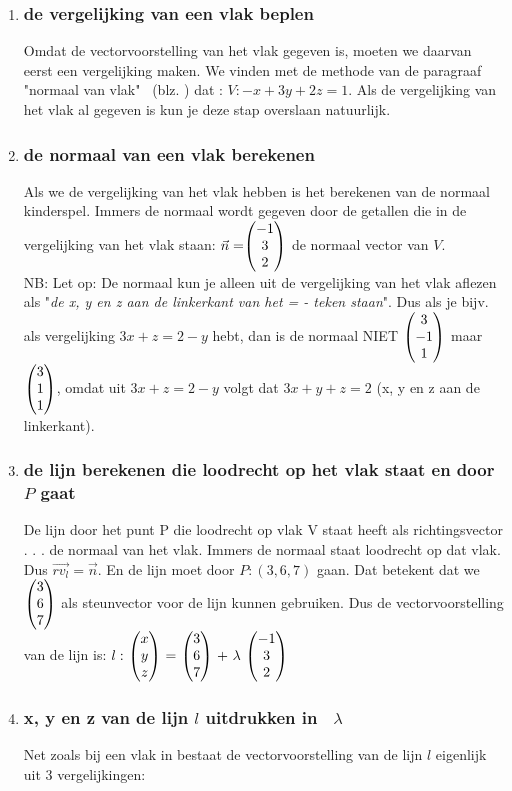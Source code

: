 \begin{enumerate}[label=(\alph*)]
\item \subsubsection{de vergelijking van een vlak beplen}
Omdat de vectorvoorstelling van het vlak gegeven is, moeten we daarvan eerst een vergelijking maken.
We vinden met de methode van de paragraaf "normaal van vlak" \ 
(blz. \pageref{vlaknormaal}) dat : $ V: -x + 3y +2z = 1 $.  Als de vergelijking van het vlak al gegeven is kun je deze stap overslaan natuurlijk. 
\item \subsubsection{de normaal van een vlak berekenen}
Als we de vergelijking van het vlak hebben is het berekenen van de normaal kinderspel. Immers de normaal wordt gegeven door de getallen die in de vergelijking van het vlak staan:
$ \vec{n} = \vecdrie{-1}{3}{2}  $ de normaal vector van $ V $.\\
NB: Let op: De normaal kun je alleen uit de vergelijking van het vlak aflezen als "\textit{de x, y en z aan de linkerkant van het = - teken staan}".  Dus als je bijv. als vergelijking $ 3x + z = 2 -y $ hebt, dan is de normaal NIET $  \vecdrie{3}{-1}{1}  $ maar  $ \vecdrie{3}{1}{1}  $, omdat uit $ 3x + z = 2 -y $ volgt dat $ 3x + y + z = 2 $ (x, y en z aan de linkerkant).
\item \subsubsection{de lijn berekenen die  loodrecht op het vlak staat  en door $ P $ gaat}
De lijn door het punt P die loodrecht op vlak V staat heeft als richtingsvector . . .  de normaal van het vlak. Immers de normaal staat loodrecht op dat vlak. Dus $ \overrightarrow{rv_{l}}  = \vec{n} $. En de lijn moet door $ P: (3,6,7)  $  gaan. Dat  betekent dat we $ \vecdrie{3}{6}{7} $ als steunvector voor de lijn kunnen gebruiken. Dus de vectorvoorstelling van de lijn is: $ l: \ \vecdrie{x}{y}{z} \ = \ \vecdrie{3}{6}{7} \ + \ \lambda \ \vecdrie{-1}{3}{2} \ $
\item \subsubsection{x, y en z van de lijn $  l $  uitdrukken in \ $  \lambda $}
Net zoals bij een vlak in \RD bestaat de vectorvoorstelling van de lijn $ l  $ eigenlijk uit 3 vergelijkingen:

\end{enumerate}
